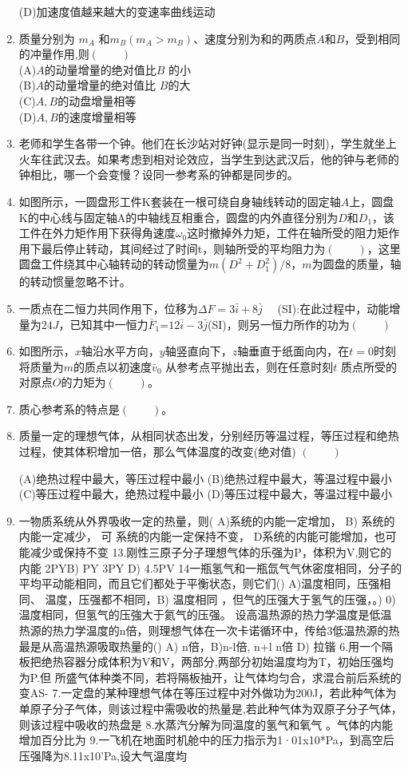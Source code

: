\begin{enumerate}
(D)加速度值越来越大的变速率曲线运动
\item 质量分别为 $m_A$ 和$m_B (m_A>m_B)$、速度分别为和的两质点$A$和$B$，受到相同的冲量作用,则$(\qquad)$\\
(A)$A$的动量增量的绝对值比$B$ 的小\\
(B)$A$的动量增量的绝对值比 $B$的大\\
(C)$A,B$的动盘增量相等\\
(D)$A,B$的速度增量相等
\item 老师和学生各带一个钟。他们在长沙站对好钟(显示是同一时刻)，学生就坐上火车往武汉去。如果考虑到相对论效应，当学生到达武汉后，他的钟与老师的钟相比，哪一个会变慢？设同一参考系的钟都是同步的。
\item 如图所示，一圆盘形工件K套装在一根可绕自身轴线转动的固定轴$A$上，圆盘K的中心线与固定轴A的中轴线互相重合，圆盘的内外直径分别为$D$和$D_1$，该工件在外力矩作用下获得角速度$\omega_0$这时撤掉外力矩，工件在轴所受的阻力矩作用下最后停止转动，其间经过了时间t，则轴所受的平均阻力为$(\qquad)$，这里圆盘工件绕其中心轴转动的转动惯量为$m(D^2+D^2_1)/8$，$m$为圆盘的质量，轴的转动惯量忽略不计。
\item 一质点在二恒力共同作用下，位移为$\Delta F=3\bar i +8\bar j \quad$ (SI):在此过程中，动能增量为$24J$，已知其中一恒力$\bar F_1$=$12 \bar i-3 \bar j$(SI)，则另一恒力所作的功为$(\qquad)$
\item 如图所示，$x$轴沿水平方向，$y$轴竖直向下，$z$轴垂直于纸面向内，在$t=0$时刻将质量为$m$的质点以初速度$\bar v_0$ 从参考点平抛出去，则在任意时刻$t$ 质点所受的对原点$O$的力矩为$(\qquad)$。
\item 质心参考系的特点是$(\qquad)$。
\item 质量一定的理想气体，从相同状态出发，分别经历等温过程，等压过程和绝热过程，使其体积增加一倍，那么气体温度的改变(绝对值) $(\qquad)$

(A)绝热过程中最大，等压过程中最小
(B)绝热过程中最大，等温过程中最小
(C)等压过程中最大，绝热过程中最小
(D)等压过程中最大，等温过程中最小
\item 一物质系统从外界吸收一定的热量，则(
A)系统的内能一定增加，
B)
系统的内能一定减少，
可
系统的内能一定保持不变，
D系统的内能可能增加，也可能减少或保持不变
13.刚性三原子分子理想气体的乐强为P，体积为V,则它的内能
2PYB) PY
3PY
D) 4.5PV
14一瓶氢气和一瓶氙气气休密度相同，分子的平均平动能相同，而且它们都处于平衡状态，则它们()
A)温度相同，压强相同、
温度，压强都不相同，B)
温度相同 ，但气的压强大于氢气的压强，。)
0)温度相同，但氢气的压強大于氦气的压强。
设高温热源的热力学温度是低温热源的热力学温度的n倍，则理想气体在一次卡诺循环中，传给3低温热源的热最是从高温热源吸取热量的()
A) n倍，B)n-l倍,
n+l
n倍
D)
拉锴
6.用一个隔板把绝热容器分成体积为V和V，两部分,两部分初始温度均为T，初始压强均为P.但
所盛气体种类不同，若将隔板抽开，让气体均匀合，求混合前后系统的变AS-
7.一定盘的某种理想气体在等压过程中对外做功为200J，若此种气体为单原子分子气体，则该过程中需吸收的热量是,若此种气体为双原子分子气体，则该过程中吸收的热盘是
8.水蒸汽分解为同温度的氢气和氧气 。气体的内能增加百分比为
9.一飞机在地面时机舱中的压力指示为1·01x10*Pa，到高空后压强降为8.11x10'Pa,设大气温度均
\end{enumerate}
